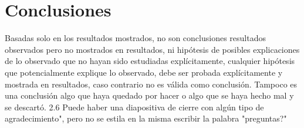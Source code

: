 \documentclass[11pt]{article}
\begin{document}
    \section{Conclusiones}

        Basadas solo en los resultados mostrados, no son conclusiones
        resultados observados pero no mostrados en resultados, ni hipótesis de posibles explicaciones de
        lo observado que no hayan sido estudiadas explícitamente, cualquier hipótesis que
        potencialmente explique lo observado, debe ser probada explícitamente y mostrada en resultados,
        caso contrario no es válida como conclusión. Tampoco es una conclusión algo que haya quedado
        por hacer o algo que se haya hecho mal y se descartó.
        2.6 Puede haber una diapositiva de cierre con algún tipo de agradecimiento", pero no se estila en
        la misma escribir la palabra "preguntas?"
\end{document}
